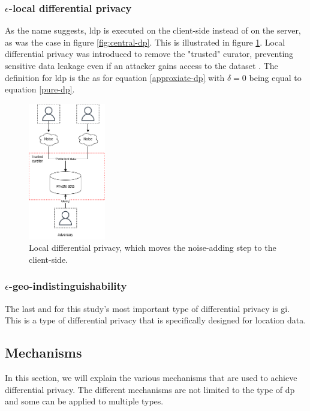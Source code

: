\subsubsection{$\epsilon$-local differential privacy}
As the name suggests, \gls{ldp} is executed on the client-side instead of on the server, as was the case in figure \ref{fig:central-dp}.
This is illustrated in figure \ref{fig:local-dp}.
Local differential privacy was introduced to remove the "trusted" curator, preventing sensitive data leakage even if an attacker gains access to the dataset \citep{del_rey_comprehensive_2020}.
The definition for \gls{ldp} is the as for equation \ref{approxiate-dp} with $\delta = 0$ being equal to equation \ref{pure-dp}.
\begin{figure}[h]
  \includegraphics[width=0.3\textwidth]{TheorethicalFramework/Differential privacy/master-thesis-Pagina-8.png}
  \caption{Local differential privacy, which moves the noise-adding step to the client-side.}
  \label{fig:local-dp}
\end{figure}

\subsubsection{$\epsilon$-geo-indistinguishability}
The last and for this study's most important type of differential privacy is \gls{gi}.
This is a type of differential privacy that is specifically designed for location data.
\subsection{Mechanisms}
In this section, we will explain the various mechanisms that are used to achieve differential privacy.
The different mechanisms are not limited to the type of \gls{dp} and some can be applied to multiple types.

